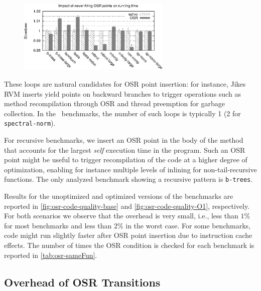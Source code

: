 \ifdefined\noauthorea
\begin{figure}[t]
\begin{center}
\includegraphics[width=0.65\textwidth]{figures/osr-code-quality-O1/osr-code-quality-O1.eps}
\caption{\protect}
\end{center}
\end{figure}
\fi

These loops are natural candidates for OSR point insertion: for instance, Jikes RVM inserts yield points on backward branches to trigger operations such as method recompilation through OSR and thread preemption for garbage collection. In the \shootout\ benchmarks, the number of such loops is typically 1 (2 for {\tt spectral-norm}).

For recursive benchmarks, we insert an OSR point in the body of the method that accounts for the largest {\em self} execution time in the program. Such an OSR point might be useful to trigger recompilation of the code at a higher degree of optimization, enabling for instance multiple levels of inlining for non-tail-recursive functions. The only analyzed benchmark showing a recursive pattern is {\tt b-trees}.

Results for the unoptimized and optimized versions of the benchmarks are reported in \myfigure\ref{fig:osr-code-quality-base} and \myfigure\ref{fig:osr-code-quality-O1}, respectively. For both scenarios we observe that the overhead is very small, i.e., less than $1\%$ for most benchmarks and less than $2\%$ in the worst case. For some benchmarks, code might run slightly faster after OSR point insertion due to instruction cache effects.
The number of times the OSR condition is checked for each benchmark is
reported in \mytable\ref{tab:osr-sameFun}.

\subsection{Overhead of OSR Transitions}

